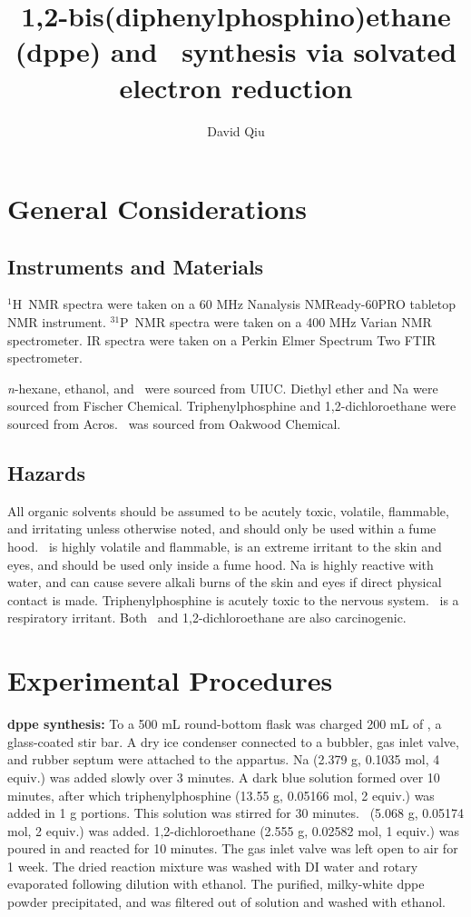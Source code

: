 \documentclass[journal = jacsat, manuscript = suppinfo]{achemso}
\title{1,2-bis(diphenylphosphino)ethane (dppe) and \nidppe\ synthesis via
solvated electron reduction}
\author{David Qiu}
\affiliation{Department of Chemistry, University of Illinois at
Urbana-Champaign, 505 S Matthews Avenue, Urbana, IL, 61801}
\newcommand{\nicl}{\ce{NiCl2 $\cdot$ 6H2O}}
\newcommand{\nh}{\ce{NH3}}
\newcommand{\nhbr}{\ce{NH4Br}}
\newcommand{\h}{$^1$H}
\newcommand{\p}{$^{31}$P}
\begin{document}
\tableofcontents

\newpage

\section{General Considerations}

\subsection{Instruments and Materials}

\h\ NMR spectra were taken on a 60 MHz Nanalysis NMReady-60PRO tabletop NMR
instrument. \p\ NMR spectra were taken on a 400 MHz  Varian NMR spectrometer. IR
spectra were taken on a Perkin Elmer Spectrum Two FTIR spectrometer.

\textit{n}-hexane, ethanol, and \nh\ were sourced from UIUC. Diethyl ether and
Na were sourced from Fischer Chemical. Triphenylphosphine and 1,2-dichloroethane
were sourced from Acros. \nhbr\ was sourced from Oakwood Chemical.

\subsection{Hazards}

All organic solvents should be assumed to be acutely toxic, volatile, flammable,
and irritating unless otherwise noted, and should only be used within a fume
hood. \nh\ is highly volatile and flammable, is an extreme irritant to the skin
and eyes, and should be used only inside a fume hood.  Na is highly reactive
with water, and can cause severe alkali burns of the skin and eyes if direct
physical contact is made.  Triphenylphosphine is acutely toxic to the nervous
system. \nhbr\ is a respiratory irritant. Both \nicl\ and 1,2-dichloroethane are
also carcinogenic.

\section{Experimental Procedures}

\textbf{dppe synthesis\cite{handout}:} To a 500 mL round-bottom flask was
charged 200 mL of \nh, a glass-coated stir bar. A dry ice condenser connected to
a bubbler, gas inlet valve, and rubber septum were attached to the appartus. Na
(2.379 g, 0.1035 mol, 4 equiv.) was added slowly over 3 minutes. A dark blue
solution formed over 10 minutes, after which triphenylphosphine (13.55 g,
0.05166 mol, 2 equiv.) was added in 1 g portions.  This solution was stirred for
30 minutes. \nhbr\ (5.068 g, 0.05174 mol, 2 equiv.) was added.
1,2-dichloroethane (2.555 g, 0.02582 mol, 1 equiv.) was poured in and reacted
for 10 minutes. The gas inlet valve was left open to air for 1 week. The dried
reaction mixture was washed with DI water and rotary evaporated following
dilution with ethanol. The purified, milky-white dppe powder precipitated, and
was filtered out of solution and washed with ethanol.
\end{document}
